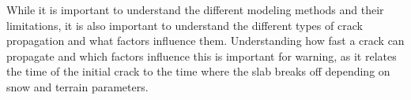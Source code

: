 \documentclass[10pt]{article}
\begin{document}
  
  While it is important to understand the different modeling methods and their limitations, it is also important to understand the different types of crack propagation and what factors influence them. Understanding how fast a crack can propagate and which factors influence this is important for warning, as it relates the time of the initial crack to the time where the slab breaks off depending on snow and terrain parameters.  \par

  
\end{document}
